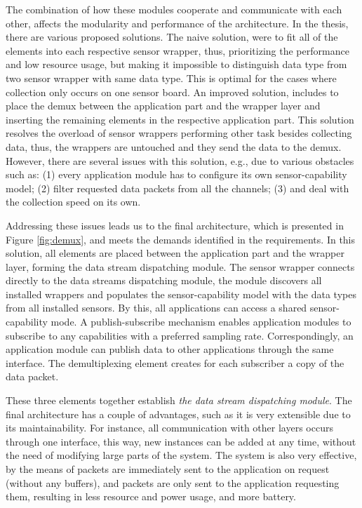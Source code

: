 The combination of how these modules cooperate and communicate with each other, affects the modularity and performance of the architecture. In the thesis, there are various proposed solutions. The naive solution, were to fit all of the elements into each respective sensor wrapper, thus, prioritizing the performance and low resource usage, but making it impossible to distinguish data type from two sensor wrapper with same data type. This is optimal for the cases where collection only occurs on one sensor board. An improved solution, includes to place the demux between the application part and the wrapper layer and inserting the remaining elements in the respective application part. This solution resolves the overload of sensor wrappers performing other task besides collecting data, thus, the wrappers are untouched and they send the data to the demux. However, there are several issues with this solution, e.g., due to various obstacles such as: (1) every application module has to configure its own sensor-capability model; (2) filter requested data packets from all the channels; (3) and deal with the collection speed on its own.

Addressing these issues leads us to the final architecture, which is presented in Figure \ref{fig:demux}, and meets the demands identified in the requirements. In this solution, all elements are placed between the application part and the wrapper layer, forming the data stream dispatching module. The sensor wrapper connects directly to the data streams dispatching module, the module discovers all installed wrappers and populates the sensor-capability model with the data types from all installed sensors. By this, all applications can access a shared sensor-capability mode. A publish-subscribe mechanism enables application modules to subscribe to any capabilities with a preferred sampling rate. Correspondingly, an application module can publish data to other applications through the same interface. The demultiplexing element creates for each subscriber a copy of the data packet.

These three elements together establish \textit{the data stream dispatching module}. The final architecture has a couple of advantages, such as it is very extensible due to its maintainability. For instance, all communication with other layers occurs through one interface, this way, new instances can be added at any time, without the need of modifying large parts of the system. The system is also very effective, by the means of packets are immediately sent to the application on request (without any buffers), and packets are only sent to the application requesting them, resulting in less resource and power usage, and more battery.